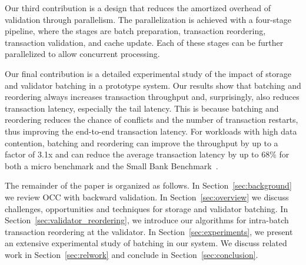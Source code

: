 
Our third contribution is a design that reduces the amortized overhead of validation through parallelism. The parallelization is achieved with a four-stage pipeline, where the stages are batch preparation, transaction reordering, transaction validation, and cache update. Each of these stages can be further parallelized to allow concurrent processing. 

Our final contribution is a detailed experimental study of the impact of storage and validator batching in a prototype system. Our results show that batching and reordering always increases transaction throughput and, surprisingly, also reduces transaction latency, especially the tail latency. This is because batching and reordering reduces the chance of conflicts and the number of transaction restarts, thus improving the end-to-end transaction latency. For workloads with high data contention, batching and reordering can improve the throughput by up to a factor of 3.1x and can reduce the average transaction latency by up to 68\% for both a micro benchmark and the Small Bank Benchmark~\cite{alomari2008icde}.

The remainder of the paper is organized as follows. In Section~\ref{sec:background}  we review OCC with backward validation. In Section~\ref{sec:overview} we discuss challenges, opportunities and techniques for storage and validator batching. In Section~\ref{sec:validator_reordering}, we introduce our algorithms for intra-batch transaction reordering at the validator. In Section~\ref{sec:experiments}, we present an extensive experimental study of batching in our system. We discuss related work in Section~\ref{sec:relwork} and conclude in Section~\ref{sec:conclusion}.

